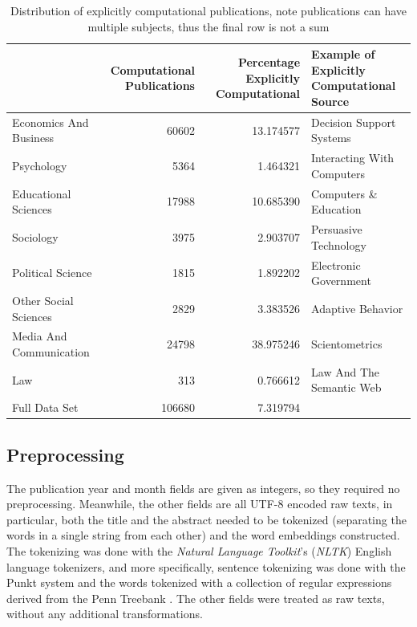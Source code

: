 \documentclass[12pt, a4paper]{article}
\begin{document}
\begin{table}[h]
	\centering
	\begin{adjustbox}{center}
		\begin{tabular}{lrrl}
			\toprule
			{} &  \pbox{20cm}{Computational\\ Publications} &  \pbox{20cm}{Percentage\\Explicitly Computational} &  \pbox{20cm}{Example of Explicitly\\Computational Source} \\
			\midrule
			Economics And Business  &           \num{60602} &        \num{13.174577} &    Decision Support Systems \\
			Psychology              &            \num{5364} &         \num{1.464321} &  Interacting With Computers \\
			Educational Sciences    &           \num{17988} &        \num{10.685390} &       Computers \& Education \\
			Sociology               &            \num{3975} &         \num{2.903707} &       Persuasive Technology \\
			Political Science       &            \num{1815} &         \num{1.892202} &       Electronic Government \\
			Other Social Sciences   &            \num{2829} &         \num{3.383526} &           Adaptive Behavior \\
			Media And Communication &           \num{24798} &        \num{38.975246} &              Scientometrics \\
			Law                     &             \num{313} &         \num{0.766612} &    Law And The Semantic Web \\
			\midrule
			Full Data Set           &          \num{106680} &         \num{7.319794} &   \\
			\bottomrule
		\end{tabular}
	\end{adjustbox}
	\caption{Distribution of explicitly computational publications, note publications can have multiple subjects, thus the final row is not a sum}\label{sum_comp}
\end{table}


\subsection{Preprocessing}

The publication year and month fields are given as integers, so they required no preprocessing. Meanwhile, the other fields are all UTF-8 encoded raw texts, in particular, both the title and the abstract needed to be tokenized (separating the words in a single string from each other) and the word embeddings constructed. The tokenizing was done with the \textit{Natural Language Toolkit}'s (\textit{NLTK}) \citep{bird2006nltk} English language tokenizers, and more specifically, sentence tokenizing was done with the Punkt system \citep{kiss2006unsupervised} and the words tokenized with a collection of regular expressions derived from the Penn Treebank \citep{marcus1993building}. The other fields were treated as raw texts, without any additional transformations.
\end{document}
